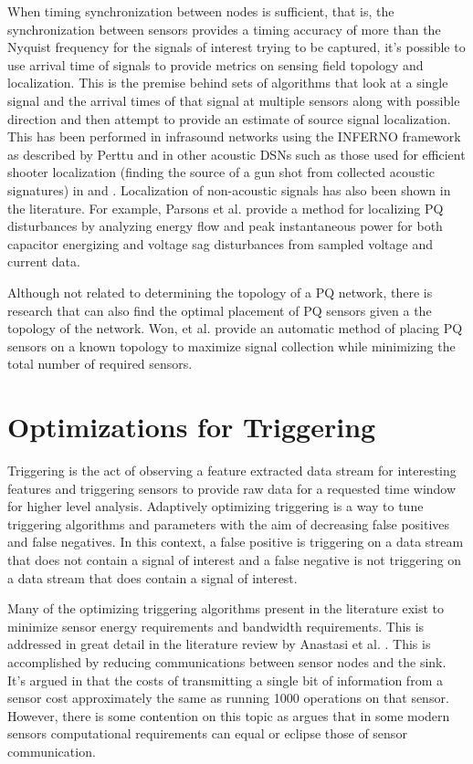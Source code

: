 When timing synchronization between nodes is sufficient, that is, the synchronization between sensors provides a timing accuracy of more than the Nyquist frequency for the signals of interest trying to be captured, it's possible to use arrival time of signals to provide metrics on sensing field topology and localization. This is the premise behind sets of algorithms that look at a single signal and the arrival times of that signal at multiple sensors along with possible direction and then attempt to provide an estimate of source signal localization. This has been performed in infrasound networks using the INFERNO framework as described by Perttu\cite{perttu2013regional} and in other acoustic DSNs such as those used for efficient shooter localization (finding the source of a gun shot from collected acoustic signatures) in \cite{gezici2005localization} and \cite{maroti2004shooter}. Localization of non-acoustic signals has also been shown in the literature. For example, Parsons et al. provide a method for localizing PQ disturbances by analyzing energy flow and peak instantaneous power for both capacitor energizing  and voltage sag disturbances from sampled voltage and current data\cite{parsons1998direction}.

Although not related to determining the topology of a PQ network, there is research that can also find the optimal placement of PQ sensors given a the topology of the network. Won, et al.\cite{won2008optimal} provide an automatic method of placing PQ sensors on a known topology to maximize signal collection while minimizing the total number of required sensors.

\section{Optimizations for Triggering}\label{sec:optimizations-for-triggering}
Triggering is the act of observing a feature extracted data stream for interesting features and triggering sensors to provide raw data for a requested time window for higher level analysis. Adaptively optimizing triggering is a way to tune triggering algorithms and parameters with the aim of decreasing false positives and false negatives. In this context, a false positive is triggering on a data stream that does not contain a signal of interest and a false negative is not triggering on a data stream that does contain a signal of interest.

Many of the optimizing triggering algorithms present in the literature exist to minimize sensor energy requirements and bandwidth requirements. This is addressed in great detail in the literature review by Anastasi et al. \cite{anastasi_energy_2009}. This is accomplished by reducing communications between sensor nodes and the sink. It's argued in \cite{pottie2000wireless} that the costs of transmitting a single bit of information from a sensor cost approximately the same as running 1000 operations on that sensor. However, there is some contention on this topic as \cite{alippi_adaptive_2010} argues that in some modern sensors computational requirements can equal or eclipse those of  sensor communication.

